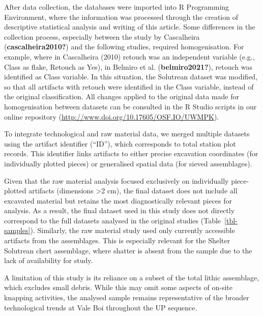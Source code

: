 \documentclass[
  a4paper,
  DIV=11,
  numbers=noendperiod]{scrreprt}
\begin{document}
After data collection, the databases were imported into R Programming
Environment, where the information was processed through the creation of
descriptive statistical analysis and writing of this article. Some
differences in the collection process, especially between the study by
Cascalheira (\textbf{cascalheira2010?}) and the following studies,
required homogenisation. For example, where in Cascalheira (2010)
retouch was an independent variable (e.g., Class as flake, Retouch as
Yes), in Belmiro et al. (\textbf{belmiro2021?}), retouch was identified
as Class variable. In this situation, the Solutrean dataset was
modified, so that all artifacts with retouch were identified in the
Class variable, instead of the original classification. All changes
applied to the original data made for homogenisation between datasets
can be consulted in the R Studio scripts in our online repository
(\url{http://www.doi.org/10.17605/OSF.IO/UWMPK}).

To integrate technological and raw material data, we merged multiple
datasets using the artifact identifier (``ID''), which corresponds to
total station plot records. This identifier links artifacts to either
precise excavation coordinates (for individually plotted pieces) or
generalised spatial data (for sieved assemblages).

Given that the raw material analysis focused exclusively on individually
piece-plotted artifacts (dimensions \textgreater2 cm), the final dataset
does not include all excavated material but retains the most
diagnostically relevant pieces for analysis. As a result, the final
dataset used in this study does not directly correspond to the full
datasets analysed in the original studies (Table~\ref{tbl-samples}).
Similarly, the raw material study used only currently accessible
artifacts from the assemblages. This is especially relevant for the
Shelter Solutrean chert assemblage, where shatter is absent from the
sample due to the lack of availability for study.

A limitation of this study is its reliance on a subset of the total
lithic assemblage, which excludes small debris. While this may omit some
aspects of on-site knapping activities, the analysed sample remains
representative of the broader technological trends at Vale Boi
throughout the UP sequence.
\end{document}
